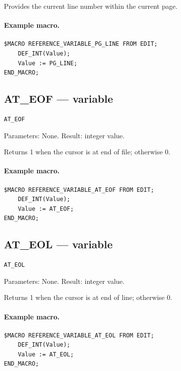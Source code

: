 \documentclass[a4paper,10pt,twoside,openany]{book}
\begin{document}
Provides the current line number within the current page.

\paragraph{Example macro.}
\begin{verbatim}
$MACRO REFERENCE_VARIABLE_PG_LINE FROM EDIT;
    DEF_INT(Value);
    Value := PG_LINE;
END_MACRO;
\end{verbatim}

\label{prim:variable-at-eof}
\subsection*{AT\_EOF --- variable}
\begin{verbatim}
AT_EOF
\end{verbatim}
Parameters: None. Result: integer value.

Returns 1 when the cursor is at end of file; otherwise 0.

\paragraph{Example macro.}
\begin{verbatim}
$MACRO REFERENCE_VARIABLE_AT_EOF FROM EDIT;
    DEF_INT(Value);
    Value := AT_EOF;
END_MACRO;
\end{verbatim}

\label{prim:variable-at-eol}
\subsection*{AT\_EOL --- variable}
\begin{verbatim}
AT_EOL
\end{verbatim}
Parameters: None. Result: integer value.

Returns 1 when the cursor is at end of line; otherwise 0.

\paragraph{Example macro.}
\begin{verbatim}
$MACRO REFERENCE_VARIABLE_AT_EOL FROM EDIT;
    DEF_INT(Value);
    Value := AT_EOL;
END_MACRO;
\end{verbatim}

\label{prim:variable-block-stat}
\end{document}
